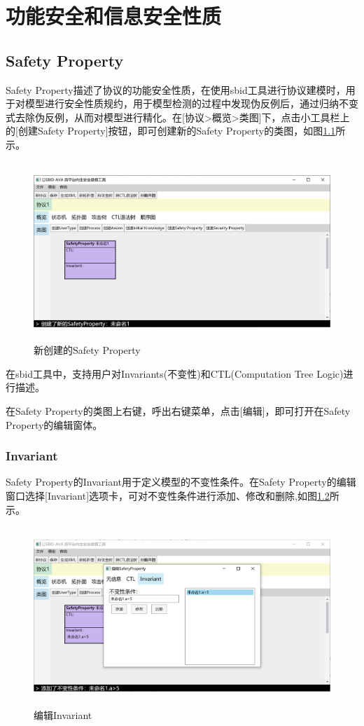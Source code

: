 \chapter{功能安全和信息安全性质}

\section{Safety Property}
Safety Property描述了协议的功能安全性质，在使用sbid工具进行协议建模时，用于对模型进行安全性质规约，用于模型检测的过程中发现伪反例后，通过归纳不变式去除伪反例，从而对模型进行精化。在[协议>概览>类图]下，点击小工具栏上的[创建Safety Property]按钮，即可创建新的Safety Property的类图，如图\ref{create_safety}所示。
\begin{figure}[h]
	\centering
	\includegraphics[width=12cm,height=6.75cm]{imgs/create_safety.png}
	\caption{新创建的Safety Property}
	\label{create_safety}
\end{figure}
\par
在sbid工具中，支持用户对Invariants(不变性)和CTL(Computation Tree Logic)进行描述。
\par
在Safety Property的类图上右键，呼出右键菜单，点击[编辑]，即可打开在Safety Property的编辑窗体。
\subsection{Invariant}
\par
Safety Property的Invariant用于定义模型的不变性条件。在Safety Property的编辑窗口选择[Invariant]选项卡，可对不变性条件进行添加、修改和删除,如图\ref{safety_edit_invariants}所示。
\begin{figure}[h]
	\centering
	\includegraphics[width=12cm,height=6.75cm]{imgs/safety_edit_invariants.png}
	\caption{编辑Invariant}
	\label{safety_edit_invariants}
\end{figure}
